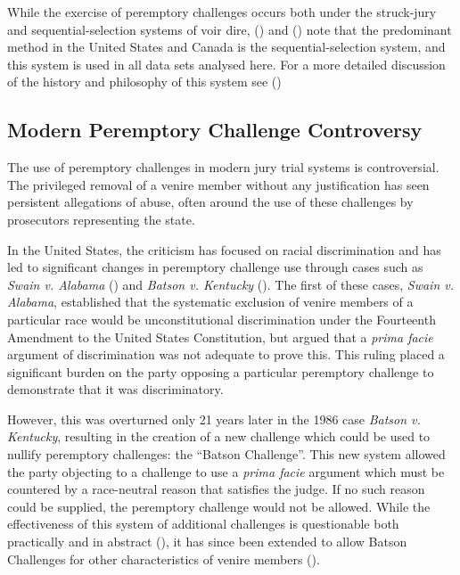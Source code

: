 While the exercise of peremptory challenges occurs both under the struck-jury and sequential-selection systems of voir dire, (\cite{ford2010}) and (\cite{vandykejurysel}) note that the predominant method in the United States and Canada is the sequential-selection system, and this system is used in all data sets analysed here. For a more detailed discussion of the history and philosophy of this system see (\cite{vonmosch1921, hoffman1997, woolley2018, rvsherratt, hansvidjudging, vandykejurysel})

\subsection{Modern Peremptory Challenge Controversy} \label{sec:modper}

The use of peremptory challenges in modern jury trial systems is controversial. The privileged
removal of a venire member without any justification
has seen persistent allegations of abuse, often around the use of these challenges by prosecutors representing the state.

In the United States, the criticism has focused on racial
discrimination and has led to significant changes in peremptory challenge use
through cases such as \textit{Swain v. Alabama} (\cite{swainvalabama}) and \textit{Batson v. Kentucky}
(\cite{batsonvkentucky}). The first of these cases, \textit{Swain v. Alabama}, established that the systematic exclusion
of venire members of a particular race would be unconstitutional discrimination under the Fourteenth Amendment to the United
States Constitution, but argued that a \textit{prima facie} argument
of discrimination was not adequate to prove this. This ruling placed a significant burden on the party opposing a
particular peremptory challenge to demonstrate that it was discriminatory.

However, this was overturned only 21 years later in the 1986 case \textit{Batson v. Kentucky}, resulting in the creation of a new challenge which
could be used to nullify peremptory challenges: the ``Batson Challenge''. This new system allowed the
party objecting to a challenge to use a \textit{prima facie} argument which must be countered by a race-neutral reason that
satisfies the judge. If no such reason could be supplied, the peremptory challenge would not be allowed. While the
effectiveness of this system of additional challenges is questionable both practically and in abstract (\cite{page2005, morehead1994, hoffman1997}), it has since been extended to allow Batson
Challenges for other characteristics of venire members (\cite{jebvalabama}).

